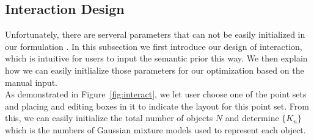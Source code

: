 \subsection{Interaction Design}
\label{sec:imp:interact}
Unfortunately, there are serveral parameters that can not be easily initialized in our formulation . In this subsection we first introduce our design of interaction, which is intuitive for users to input the semantic prior this way. We then explain how we can easily initlialize those parameters for our optimization based on the manual input.\\
As demonstrated in Figure~\ref{fig:interact}, we let user choose one of the point sets and placing and editing boxes in it to indicate the layout for this point set. From this, we can easily initialize the total number of objects $N$ and determine $\{K_n\}$ which is the numbers of Gaussian mixture models used to represent each object.
